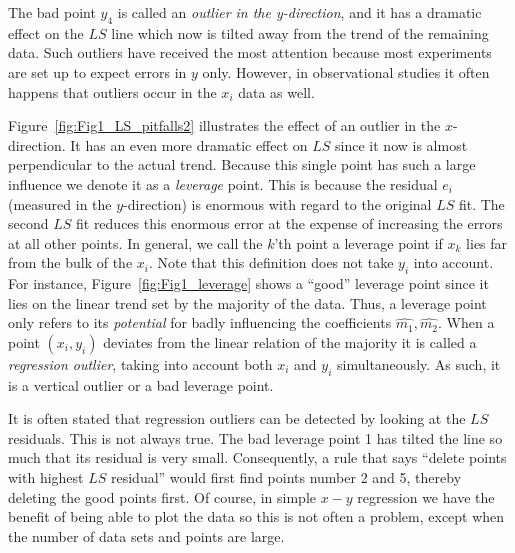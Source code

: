 
The bad point $y_4$  is called an \emph{outlier in the y-direction}, and it has a dramatic effect on the $LS$ line 
which now is tilted away from the trend of the remaining data.  Such outliers have received the most 
attention because most experiments are set up to expect errors in $y$ only.  However, in 
observational studies it often happens that outliers occur in the $x_i$ data as well.


Figure~\ref{fig:Fig1_LS_pitfalls2} illustrates the effect of an outlier in the $x$-direction.
It has an even more dramatic 
effect on $LS$ since it now is almost perpendicular to the actual trend.  Because this single point 
has such a large influence we denote it as a \emph{leverage} point.
This is because the residual $e_i$ 
(measured in the $y$-direction) is enormous with regard to the original $LS$ fit.  The second $LS$ fit 
reduces this enormous error at the expense of increasing the errors at all other points.  In 
general, we call the $k$'th  point a leverage point if $x_k$ lies far from the bulk of the $x_i$.  Note that this 
definition does not take $y_i$ into account.  For instance, Figure~\ref{fig:Fig1_leverage} shows a ``good'' leverage 
point since it lies on the linear trend set by the majority of the data.  Thus, a leverage point only 
refers to its \emph{potential} for badly influencing the coefficients $\hat{m_1}, \hat{m_2}$.
When a point $(x_i, y_i)$ deviates from the linear relation of the majority it is called a \emph{regression outlier},
taking into account both $x_i$ and $y_i$ simultaneously.  As such, it is a vertical outlier or a bad 
leverage point.
	
It is often stated that regression outliers can be detected by looking at the $LS$ residuals. This is 
not always true.  The bad leverage point 1 has tilted the line so much  that its residual is very 
small.  Consequently, a rule that says ``delete points with highest $LS$ residual'' would first find points 
number 2 and 5, thereby deleting the good points first.  Of course, in simple $x-y$ regression we have the 
benefit of being able to plot the data so this is not often a problem, except when the number of 
data sets and points are large.

